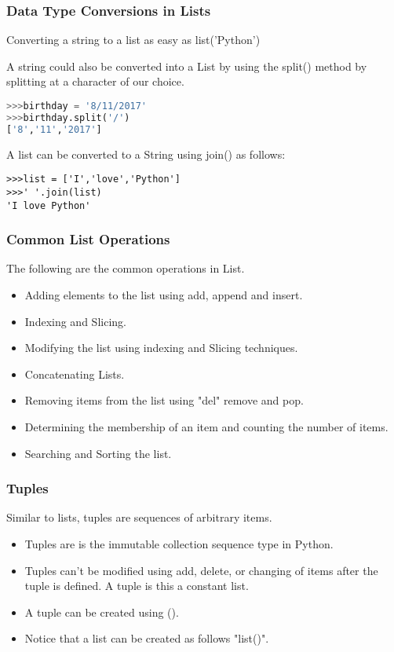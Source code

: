 \documentclass{beamer}
\begin{document}
\begin{frame}[fragile]
\frametitle{Data Type Conversions in Lists}
Converting a string to a list as easy as list('Python')

A string could also be converted into a List by using the split() method by splitting at a character of our choice.

\begin{lstlisting}[language=Python]
>>>birthday = '8/11/2017'
>>>birthday.split('/')
['8','11','2017']
\end{lstlisting}
A list can be converted to a String using join() as follows:
\begin{lstlisting}
>>>list = ['I','love','Python']
>>>' '.join(list)
'I love Python'
\end{lstlisting}
\end{frame}

\begin{frame}
\frametitle{Common List Operations}
The following are the common operations in List.
\begin{itemize}
\item Adding elements to the list using add, append and insert.
\item Indexing and Slicing.
\item Modifying the list using indexing and Slicing techniques.
\item Concatenating Lists.
\item Removing items from the list using "del" remove and pop.
\item Determining the membership of an item and counting the number of items.
\item Searching and Sorting the list.

\end{itemize}
\end{frame}

\begin{frame}
\frametitle{Tuples}
Similar to lists, tuples are sequences of arbitrary items. 
\begin{itemize}
\item Tuples are is the immutable collection sequence type in Python.
\item Tuples can’t be modified using add, delete, or changing of items after the tuple is defined. A tuple is this a constant list.
\item A tuple can be created using ().
\item Notice that a list can be created as follows "list()".
\end{itemize}
\end{frame}
\end{document}
